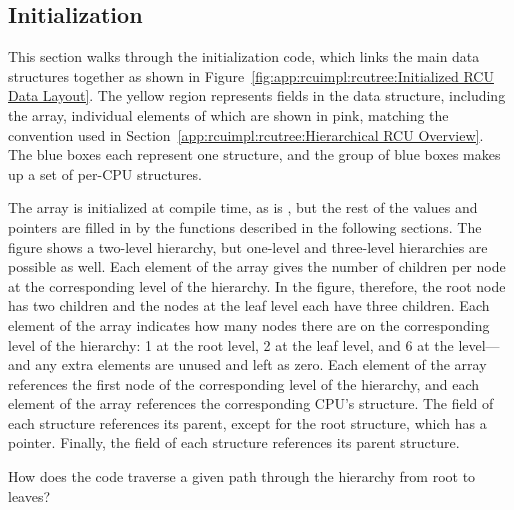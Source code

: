 \subsection{Initialization}
\label{app:rcuimpl:rcutreewt:Initialization}

\begin{figure*}[tb]
\centering
{}
\caption{Initialized RCU Data Layout}
\label{fig:app:rcuimpl:rcutree:Initialized RCU Data Layout}
\end{figure*}

This section walks through the initialization code, which links the
main data structures together as shown in
Figure~\ref{fig:app:rcuimpl:rcutree:Initialized RCU Data Layout}.
The yellow region represents fields in the  data
structure, including the  array, individual elements
of which are shown in pink, matching the convention used in
Section~\ref{app:rcuimpl:rcutree:Hierarchical RCU Overview}.
The blue boxes each represent one  structure,
and the group of blue boxes makes up a set of per-CPU 
structures.

The  array is initialized at compile time, as is
, but the rest of the values and pointers are filled
in by the functions described in the following sections.
The figure shows a two-level hierarchy, but one-level and three-level
hierarchies are possible as well.
Each element of the  array gives the number of
children per node at the corresponding level of the hierarchy.
In the figure, therefore, the root node has two children and the
nodes at the leaf level each have three children.
Each element of the  array indicates how many nodes
there are on the corresponding level of the hierarchy: 1 at the root
level, 2 at the leaf level, and 6 at the  level---and any
extra elements are unused and left as zero.
Each element of the  array references the first
node of the corresponding level of the  hierarchy,
and each element of the  array references the corresponding
CPU's  structure.
The  field of each  structure references
its parent, except for the root  structure, which
has a   pointer.
Finally, the  field of each  structure
references its parent  structure.

\QuickQuiz{}
	How does the code traverse a given path through
	the  hierarchy from root to leaves?
 \QuickQuizEnd

